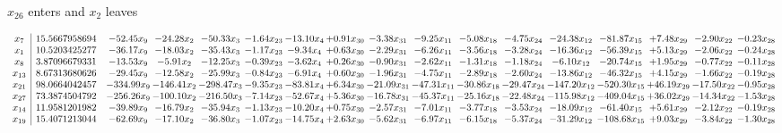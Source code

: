 \documentclass[9pt]{article}
\begin{document}
 $ x_{26} $ enters and $ x_{2} $ leaves 

 \[\begin{array}{c| c c@{\hskip 2pt} c@{\hskip 2pt} c@{\hskip 2pt} c@{\hskip 2pt} c@{\hskip 2pt} c@{\hskip 2pt} c@{\hskip 2pt} c@{\hskip 2pt} c@{\hskip 2pt} c@{\hskip 2pt} c@{\hskip 2pt} c@{\hskip 2pt} c@{\hskip 2pt} c@{\hskip 2pt} c@{\hskip 2pt} }
 x_{7}   &  15.5667958694 & -52.45 x_{9} & -24.28 x_{2} & -50.33 x_{3} & -1.64 x_{23} & -13.10 x_{4} & +  0.91 x_{30} & -3.38 x_{31} & -9.25 x_{11} & -5.08 x_{18} & -4.75 x_{24} & -24.38 x_{12} & -81.87 x_{15} & +  7.48 x_{29} & -2.90 x_{22} & -0.23 x_{28}\\
 x_{1}   &  10.5203425277 & -36.17 x_{9} & -18.03 x_{2} & -35.43 x_{3} & -1.17 x_{23} & -9.34 x_{4} & +  0.63 x_{30} & -2.29 x_{31} & -6.26 x_{11} & -3.56 x_{18} & -3.28 x_{24} & -16.36 x_{12} & -56.39 x_{15} & +  5.13 x_{29} & -2.06 x_{22} & -0.24 x_{28}\\
 x_{8}   &  3.87096679331 & -13.53 x_{9} & -5.91 x_{2} & -12.25 x_{3} & -0.39 x_{23} & -3.62 x_{4} & +  0.26 x_{30} & -0.90 x_{31} & -2.62 x_{11} & -1.31 x_{18} & -1.18 x_{24} & -6.10 x_{12} & -20.74 x_{15} & +  1.95 x_{29} & -0.77 x_{22} & -0.11 x_{28}\\
 x_{13}   &  8.67313680626 & -29.45 x_{9} & -12.58 x_{2} & -25.99 x_{3} & -0.84 x_{23} & -6.91 x_{4} & +  0.60 x_{30} & -1.96 x_{31} & -4.75 x_{11} & -2.89 x_{18} & -2.60 x_{24} & -13.86 x_{12} & -46.32 x_{15} & +  4.15 x_{29} & -1.66 x_{22} & -0.19 x_{28}\\
 x_{21}   &  98.0664042457 & -334.99 x_{9} & -146.41 x_{2} & -298.47 x_{3} & -9.35 x_{23} & -83.81 x_{4} & +  6.34 x_{30} & -21.09 x_{31} & -47.31 x_{11} & -30.86 x_{18} & -29.47 x_{24} & -147.20 x_{12} & -520.30 x_{15} & + 46.19 x_{29} & -17.50 x_{22} & -0.95 x_{28}\\
 x_{27}   &  73.3874504792 & -256.26 x_{9} & -100.10 x_{2} & -216.50 x_{3} & -7.14 x_{23} & -52.67 x_{4} & +  5.36 x_{30} & -16.78 x_{31} & -45.37 x_{11} & -25.16 x_{18} & -22.48 x_{24} & -115.98 x_{12} & -409.04 x_{15} & + 36.02 x_{29} & -14.34 x_{22} & -1.53 x_{28}\\
 x_{14}   &  11.9581201982 & -39.89 x_{9} & -16.79 x_{2} & -35.94 x_{3} & -1.13 x_{23} & -10.20 x_{4} & +  0.75 x_{30} & -2.57 x_{31} & -7.01 x_{11} & -3.77 x_{18} & -3.53 x_{24} & -18.09 x_{12} & -61.40 x_{15} & +  5.61 x_{29} & -2.12 x_{22} & -0.19 x_{28}\\
 x_{19}   &  15.4071213044 & -62.69 x_{9} & -17.10 x_{2} & -36.80 x_{3} & -1.07 x_{23} & -14.75 x_{4} & +  2.63 x_{30} & -5.62 x_{31} & -6.97 x_{11} & -6.15 x_{18} & -5.37 x_{24} & -31.29 x_{12} & -108.68 x_{15} & +  9.03 x_{29} & -3.84 x_{22} & -1.30 x_{28}\\

\end{array}\]
\end{document}
